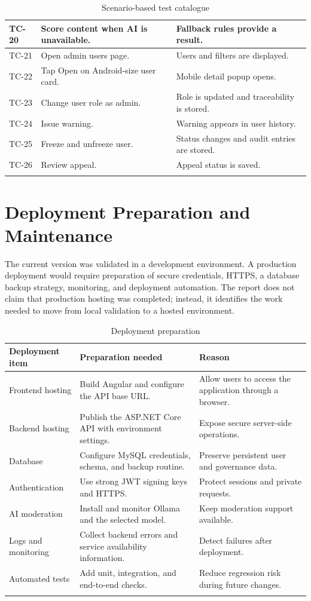 \begin{longtable}{|m{2cm}|m{5.1cm}|m{6.5cm}|}
\hline
TC-20 & Score content when AI is unavailable. & Fallback rules provide a result. \\
\hline
TC-21 & Open admin users page. & Users and filters are displayed. \\
\hline
TC-22 & Tap Open on Android-size user card. & Mobile detail popup opens. \\
\hline
TC-23 & Change user role as admin. & Role is updated and traceability is stored. \\
\hline
TC-24 & Issue warning. & Warning appears in user history. \\
\hline
TC-25 & Freeze and unfreeze user. & Status changes and audit entries are stored. \\
\hline
TC-26 & Review appeal. & Appeal status is saved. \\
\hline
\caption{Scenario-based test catalogue}
\end{longtable}

\section{Deployment Preparation and Maintenance}

The current version was validated in a development environment. A production deployment would require preparation of secure credentials, HTTPS, a database backup strategy, monitoring, and deployment automation. The report does not claim that production hosting was completed; instead, it identifies the work needed to move from local validation to a hosted environment.

\begin{longtable}{|m{3.7cm}|m{5.1cm}|m{5.2cm}|}
\hline
\textbf{Deployment item} & \textbf{Preparation needed} & \textbf{Reason} \\
\hline
Frontend hosting & Build Angular and configure the API base URL. & Allow users to access the application through a browser. \\
\hline
Backend hosting & Publish the ASP.NET Core API with environment settings. & Expose secure server-side operations. \\
\hline
Database & Configure MySQL credentials, schema, and backup routine. & Preserve persistent user and governance data. \\
\hline
Authentication & Use strong JWT signing keys and HTTPS. & Protect sessions and private requests. \\
\hline
AI moderation & Install and monitor Ollama and the selected model. & Keep moderation support available. \\
\hline
Logs and monitoring & Collect backend errors and service availability information. & Detect failures after deployment. \\
\hline
Automated tests & Add unit, integration, and end-to-end checks. & Reduce regression risk during future changes. \\
\hline
\caption{Deployment preparation}
\end{longtable}

